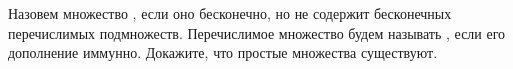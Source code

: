 Назовем множество , если оно бесконечно, но не содержит бесконечных перечислимых
подмножеств. Перечислимое множество будем называть , если его дополнение
иммунно. Докажите, что простые множества существуют.
